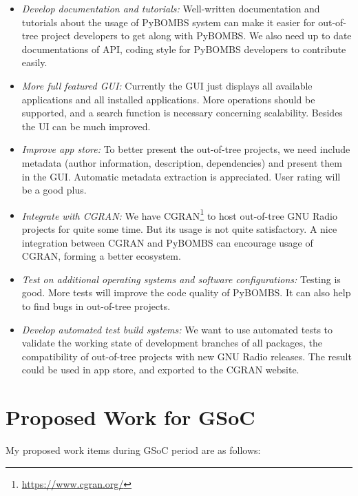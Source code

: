 \documentclass[a4paper]{article}
\begin{document}
\begin{itemize}
  \item \emph{Develop documentation and tutorials:} Well-written
    documentation and tutorials about the usage of PyBOMBS system
    can make it easier for out-of-tree
    project developers to get along with PyBOMBS.
    We also need up to date documentations of API, coding style for
    PyBOMBS developers to contribute easily.
  \item \emph{More full featured GUI:} Currently the GUI just displays
    all available applications and all installed applications.
    More operations should be supported, and a search function is
    necessary concerning scalability. Besides the UI can be much
    improved.
  \item \emph{Improve app store:} To better present the out-of-tree
    projects, we need include metadata (author information, description,
    dependencies) and present them in the GUI. Automatic metadata
    extraction is appreciated. User rating will be a good plus.
  \item \emph{Integrate with CGRAN:} We have CGRAN\footnote{%
    \url{https://www.cgran.org/}} to host out-of-tree
    GNU Radio projects for quite some time. But its usage is not quite
    satisfactory. A nice integration between CGRAN and PyBOMBS can
    encourage usage of CGRAN, forming a better ecosystem.
  \item \emph{Test on additional operating systems and software
    configurations:} Testing is good. More tests will improve the code quality of
    PyBOMBS\@. It can also help to find bugs in out-of-tree projects.
  \item \emph{Develop automated test build systems:} We want to use
    automated tests to validate the working state of development
    branches of all packages, the compatibility of out-of-tree projects
    with new GNU Radio releases. The result
    could be used in app store, and exported to the CGRAN website.
\end{itemize}

\section{Proposed Work for GSoC}

My proposed work items during GSoC period are as follows:
\end{document}
